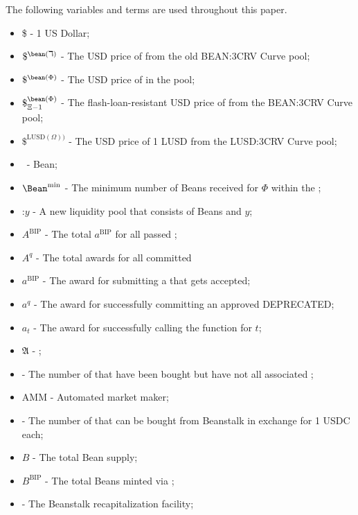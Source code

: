 \documentclass[class=article, crop=false]{standalone}
\begin{document}
The following variables and terms are used throughout this paper.
\begin{itemize}[topsep=0pt, itemsep=3pt,leftmargin=16pt]
    \item[] \$ - 1 US Dollar;
    \item[] $\$^{\bean(\daleth)}$ - The USD price of  from the old BEAN:3CRV Curve pool;
    \item[] $\$^{\bean(\Phi)}$ - The USD price of  in the pool;
    \item[] $\$^{\bean(\Phi)}_{\Xi-1}$ - The flash-loan-resistant USD price of  from the BEAN:3CRV Curve pool;
    \item[] $\$^{\text{LUSD}(\Omega))}$ - The USD price of 1 LUSD from the LUSD:3CRV Curve pool;
    \item[] \Bean\ - Bean;
    \item[] $\Bean^{\text{min}}$ - The minimum number of Beans received for   $\Phi$ within the ;
    \item[] \Bean:$y$ - A new liquidity pool that consists of Beans and $y$;
    \item[] $A^{\text{BIP}}$ - The total $a^{\text{BIP}}$ for all passed ;
    \item[] $A^q$ - The total awards for all committed     \item[] $a^{\text{BIP}}$ - The award for submitting a  that gets accepted;
    \item[] $a^q$ - The award for successfully committing an approved  DEPRECATED;
    \item[] $a_t$ - The award for successfully calling the  function for $t$;
    \item[] $\mathfrak{A}$ -  ;
    \item[]   - The number of  that have been bought but have not  all associated ;
    \item[] AMM - Automated market maker;
    \item[]   - The number of  that can be bought from Beanstalk in exchange for 1 USDC each;
    \item[] $B$ - The total Bean supply;
    \item[] $B^{\text{BIP}}$ - The total Beans minted via ;
    \item[]  - The Beanstalk recapitalization facility;

\end{itemize}
\end{document}

